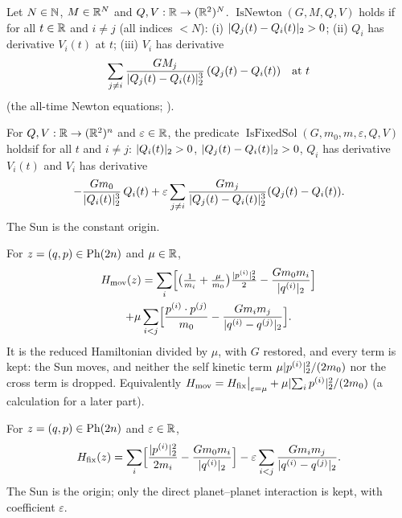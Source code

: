 \begin{definition}\label{bpP:p0:newton}
Let $N\in\mathbb{N}$, $M\in\mathbb{R}^N$ and $Q,V:\mathbb{R}\to(\mathbb{R}^2)^N$. $\operatorname{IsNewton}(G,M,Q,V)$ holds if for all $t\in\mathbb{R}$ and
$i\ne j$ (all indices $<N$): (i) $\lvert Q_j(t)-Q_i(t)\rvert_2>0$; (ii) $Q_i$ has derivative $V_i(t)$ at $t$; (iii) $V_i$ has derivative
\[\sum_{j\ne i}\frac{GM_j}{\lvert Q_j(t)-Q_i(t)\rvert_2^3}\,(Q_j(t)-Q_i(t))\quad\text{at }t\]
(the all-time Newton equations; ).
\end{definition}

\begin{definition}\label{bpP:p0:fixedsol}
For $Q,V:\mathbb{R}\to(\mathbb{R}^2)^n$ and $\varepsilon\in\mathbb{R}$, the predicate $\operatorname{IsFixedSol}(G,m_0,m,\varepsilon,Q,V)$ holds\linebreak if for all $t$ and
$i\neq j$: $\lvert Q_i(t)\rvert_2>0$, $\lvert Q_j(t)-Q_i(t)\rvert_2>0$, $Q_i$ has derivative $V_i(t)$ and $V_i$ has derivative
\[-\frac{Gm_0}{\lvert Q_i(t)\rvert_2^3}\,Q_i(t)+\varepsilon\sum_{j\ne i}\frac{Gm_j}{\lvert Q_j(t)-Q_i(t)\rvert_2^3}(Q_j(t)-Q_i(t)).\]
The Sun is the constant origin.
\end{definition}

\begin{definition}\label{bpP:p0:movham}
For $z=(q,p)\in\mathrm{Ph}(2n)$ and $\mu\in\mathbb{R}$,
\begin{multline*}
H_{\rm mov}(z)=\sum_i\Bigl[\bigl(\tfrac1{m_i}+\tfrac{\mu}{m_0}\bigr)\tfrac{\lvert p^{(i)}\rvert_2^2}2-\frac{Gm_0m_i}{\lvert q^{(i)}\rvert_2}\Bigr]\\
+\mu\sum_{i<j}\Bigl[\frac{p^{(i)}\cdot p^{(j)}}{m_0}-\frac{Gm_im_j}{\lvert q^{(i)}-q^{(j)}\rvert_2}\Bigr].
\end{multline*}
It is the reduced Hamiltonian divided by $\mu$, with $G$ restored, and every term is kept: the Sun moves, and neither the
self kinetic term $\mu\lvert p^{(i)}\rvert_2^2/(2m_0)$ nor the cross term is dropped. Equivalently
$H_{\rm mov}=H_{\rm fix}\big|_{\varepsilon=\mu}+\mu\lvert \sum_ip^{(i)}\rvert_2^2/(2m_0)$ (a calculation for a later part).
\end{definition}

\begin{definition}\label{bpP:p0:fixham}
For $z=(q,p)\in\mathrm{Ph}(2n)$ and $\varepsilon\in\mathbb{R}$,
\[H_{\rm fix}(z)=\sum_i\Bigl[\frac{\lvert p^{(i)}\rvert_2^2}{2m_i}-\frac{Gm_0m_i}{\lvert q^{(i)}\rvert_2}\Bigr]-\varepsilon\sum_{i<j}\frac{Gm_im_j}{\lvert q^{(i)}-q^{(j)}\rvert_2}.\]
The Sun is the origin; only the direct planet--planet interaction is kept, with coefficient $\varepsilon$.
\end{definition}

